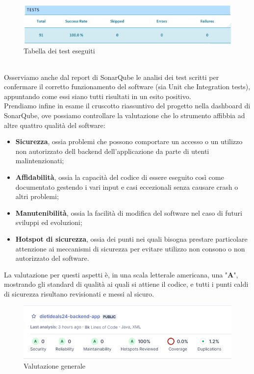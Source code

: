         \begin{figure}[htbp!]
            \centering
            \includegraphics[width=0.7\linewidth]{Immagini/Verifica Software/Tests.png}
            \caption{Tabella dei test eseguiti}
        \end{figure} \\
        Osserviamo anche dal report di SonarQube le analisi dei test scritti per confermare il corretto funzionamento del software (sia Unit che Integration tests), appuntando come essi siano tutti risultati in un esito positivo. \\
        Prendiamo infine in esame il cruscotto riassuntivo del progetto nella dashboard di SonarQube, ove possiamo controllare la valutazione che lo strumento affibbia ad altre quattro qualità del software:
        \begin{itemize}
            \item \textbf{Sicurezza}, ossia problemi che possono comportare un accesso o un utilizzo non autorizzato dell backend dell'applicazione da parte di utenti malintenzionati;
            \item \textbf{Affidabilità}, ossia la capacità del codice di essere eseguito così come documentato gestendo i vari input e casi eccezionali senza causare crash o altri problemi;
            \item \textbf{Manutenibilità}, ossia la facilità di modifica del software nel caso di futuri sviluppi ed evoluzioni;
            \item \textbf{Hotspot di sicurezza}, ossia dei punti nei quali bisogna prestare particolare attenzione ai meccanismi di sicurezza per evitare utilizzo non consono o non autorizzato del software. \\
        \end{itemize}
        La valutazione per questi aspetti è, in una scala letterale americana, una "\textbf{A}", mostrando gli standard di qualità ai quali si attiene il codice, e tutti i punti caldi di sicurezza risultano revisionati e messi al sicuro. \\
        \begin{figure}[htbp!]
            \centering
            \includegraphics[width=0.7\linewidth]{Immagini/Verifica Software/Overall.png}
            \caption{Valutazione generale}
        \end{figure} \\

